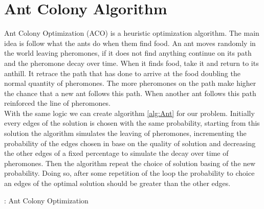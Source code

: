 \section{Ant Colony Algorithm}
Ant Colony Optimization (ACO) is a heuristic optimization algorithm. The main idea is follow what the ants do when them find food. An ant moves randomly in the world leaving pheromones, if it does not find anything continue on its path and the pheromone decay over time. When it finds food, take it and return to its anthill. It retrace the path that has done to arrive at the food doubling the normal quantity of pheromones. The more pheromones on the path make higher the chance that a new ant follows this path. When another ant follows this path reinforced the line of pheromones.\\
With the same logic we can create algorithm \ref{alg:Ant} for our problem. Initially every edges of the solution is chosen with the same probability, starting from this solution the algorithm simulates the leaving of pheromones, incrementing the probability of the edges chosen in base on the quality of solution and decreasing the other edges of a fixed percentage to simulate the decay over time of pheromones. Then the algorithm repeat the choice of solution basing of the new probability. Doing so, after some repetition of the loop the probability to choice an edges of the optimal solution should be greater than the other edges.\\

\begin{algorithm}
\caption{: Ant Colony Optimization} \label{alg:Ant}
\begin{algorithmic} 
\REPEAT
{}
\end{algorithmic}
\end{algorithm}

